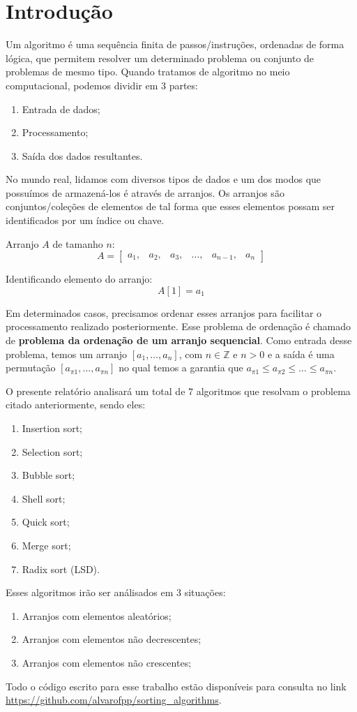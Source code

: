 \chapter{Introdução}
%
%
Um algoritmo é uma sequência finita de passos/instruções, ordenadas de forma lógica, que permitem resolver um determinado problema ou conjunto de problemas de mesmo tipo. Quando tratamos de algoritmo no meio computacional, podemos dividir em 3 partes:
\begin{enumerate}
	\item Entrada de dados;
	\item Processamento;
	\item Saída dos dados resultantes.
\end{enumerate}

%
%
No mundo real, lidamos com diversos tipos de dados e um dos modos que possuímos de armazená-los é através de arranjos. Os arranjos são conjuntos/coleções de elementos de tal forma que esses elementos possam ser identificados por um índice ou chave.

Arranjo $A$ de tamanho $n$:
$$
A = 
\begin{bmatrix}
a_{1}, & a_{2}, & a_{3}, & \dots , & a_{n-1}, & a_{n} 
\end{bmatrix}
$$

Identificando elemento do arranjo:
$$ A[1] = a_{1} $$

%
%
Em determinados casos, precisamos ordenar esses arranjos para facilitar o processamento realizado posteriormente. Esse problema de ordenação é chamado de \textbf{problema da ordenação de um arranjo sequencial}. Como entrada desse problema, temos um arranjo $[ a_{1}, \dots , a_{n} ]$, com $n \in \mathbb{Z}$ e $n > 0$ e a saída é uma permutação $[ a_{\pi1}, \dots , a_{\pi n} ]$ no qual temos a garantia que $a_{\pi 1} \le a_{\pi 2} \le \dots \le a_{\pi n}$.

O presente relatório analisará um total de 7 algoritmos que resolvam o problema citado anteriormente, sendo eles:
\begin{enumerate}
	\item Insertion sort;
	\item Selection sort;
	\item Bubble sort;
	\item Shell sort;
	\item Quick sort;
	\item Merge sort;
	\item Radix sort (LSD).
\end{enumerate}

Esses algoritmos irão ser análisados em 3 situações:
\begin{enumerate}
	\item Arranjos com elementos aleatórios;
	\item Arranjos com elementos não decrescentes;
	\item Arranjos com elementos não crescentes;
\end{enumerate}

Todo o código escrito para esse trabalho estão disponíveis para consulta no link \url{https://github.com/alvarofpp/sorting_algorithms}.